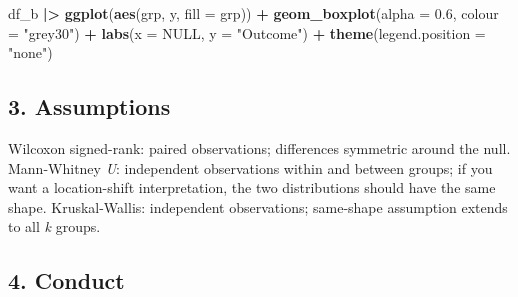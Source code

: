 \documentclass[
]{article}
\newenvironment{Shaded}{\begin{snugshade}}{\end{snugshade}}
\newcommand{\AttributeTok}[1]{\textcolor[rgb]{0.13,0.29,0.53}{#1}}
\newcommand{\ConstantTok}[1]{\textcolor[rgb]{0.56,0.35,0.01}{#1}}
\newcommand{\FloatTok}[1]{\textcolor[rgb]{0.00,0.00,0.81}{#1}}
\newcommand{\FunctionTok}[1]{\textcolor[rgb]{0.13,0.29,0.53}{\textbf{#1}}}
\newcommand{\NormalTok}[1]{#1}
\newcommand{\SpecialCharTok}[1]{\textcolor[rgb]{0.81,0.36,0.00}{\textbf{#1}}}
\newcommand{\StringTok}[1]{\textcolor[rgb]{0.31,0.60,0.02}{#1}}
\begin{document}
\begin{Shaded}
\begin{Highlighting}[]
\NormalTok{df\_b }\SpecialCharTok{|\textgreater{}}
  \FunctionTok{ggplot}\NormalTok{(}\FunctionTok{aes}\NormalTok{(grp, y, }\AttributeTok{fill =}\NormalTok{ grp)) }\SpecialCharTok{+}
  \FunctionTok{geom\_boxplot}\NormalTok{(}\AttributeTok{alpha =} \FloatTok{0.6}\NormalTok{, }\AttributeTok{colour =} \StringTok{"grey30"}\NormalTok{) }\SpecialCharTok{+}
  \FunctionTok{labs}\NormalTok{(}\AttributeTok{x =} \ConstantTok{NULL}\NormalTok{, }\AttributeTok{y =} \StringTok{"Outcome"}\NormalTok{) }\SpecialCharTok{+}
  \FunctionTok{theme}\NormalTok{(}\AttributeTok{legend.position =} \StringTok{"none"}\NormalTok{)}
\end{Highlighting}
\end{Shaded}

\subsection{3. Assumptions}\label{assumptions}

Wilcoxon signed-rank: paired observations; differences symmetric around
the null. Mann-Whitney \emph{U}: independent observations within and
between groups; if you want a location-shift interpretation, the two
distributions should have the same shape. Kruskal-Wallis: independent
observations; same-shape assumption extends to all \emph{k} groups.

\subsection{4. Conduct}\label{conduct}
\end{document}
